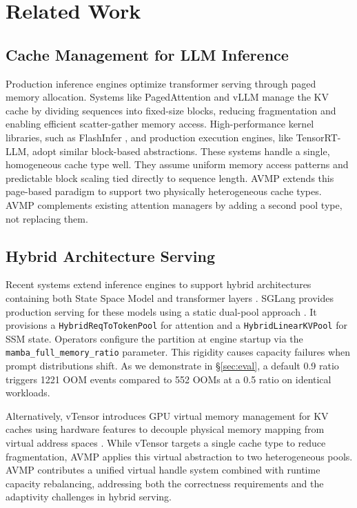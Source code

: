 \section{Related Work}
\label{sec:related}

\subsection{Cache Management for LLM Inference}
\label{sec:related:cache}

Production inference engines optimize transformer serving through paged memory allocation. Systems like PagedAttention and vLLM \cite{kwon2023pagedattention} manage the KV cache by dividing sequences into fixed-size blocks, reducing fragmentation and enabling efficient scatter-gather memory access. High-performance kernel libraries, such as FlashInfer \cite{ye2024flashinfer}, and production execution engines, like TensorRT-LLM, adopt similar block-based abstractions. These systems handle a single, homogeneous cache type well. They assume uniform memory access patterns and predictable block scaling tied directly to sequence length. AVMP extends this page-based paradigm to support two physically heterogeneous cache types. AVMP complements existing attention managers by adding a second pool type, not replacing them.

\subsection{Hybrid Architecture Serving}
\label{sec:related:hybrid}

Recent systems extend inference engines to support hybrid architectures containing both State Space Model and transformer layers \cite{dao2024mamba2, lieber2024jamba, glorioso2024zamba2, ren2024samba, dong2024hymba}. SGLang provides production serving for these models using a static dual-pool approach \cite{zheng2024sglang}. It provisions a \texttt{HybridReqToTokenPool} for attention and a \texttt{HybridLinearKVPool} for SSM state. Operators configure the partition at engine startup via the \texttt{mamba\_full\_memory\_ratio} parameter. This rigidity causes capacity failures when prompt distributions shift. As we demonstrate in \S\ref{sec:eval}, a default 0.9 ratio triggers 1221 OOM events compared to 552 OOMs at a 0.5 ratio on identical workloads.

Alternatively, vTensor introduces GPU virtual memory management for KV caches using hardware features to decouple physical memory mapping from virtual address spaces \cite{xu2024vtensor}. While vTensor targets a single cache type to reduce fragmentation, AVMP applies this virtual abstraction to two heterogeneous pools. AVMP contributes a unified virtual handle system combined with runtime capacity rebalancing, addressing both the correctness requirements and the adaptivity challenges in hybrid serving.

